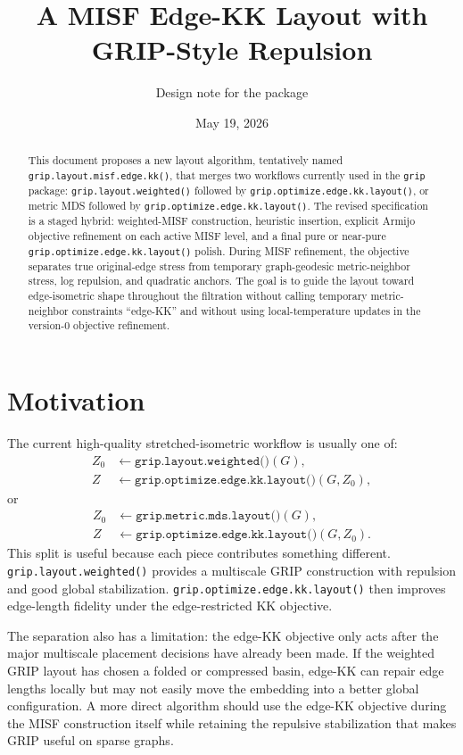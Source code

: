 \documentclass[11pt]{article}
\title{A MISF Edge-KK Layout with GRIP-Style Repulsion}
\author{Design note for the \grip{} package}
\date{May 19, 2026}
\newcommand{\grip}{\texttt{grip}}
\newcommand{\Rfunc}[1]{\texttt{#1}}
\begin{document}
\maketitle

\begin{abstract}
This document proposes a new layout algorithm, tentatively named
\Rfunc{grip.layout.misf.edge.kk()}, that merges two workflows currently used in
the \grip{} package: \Rfunc{grip.layout.weighted()} followed by
\Rfunc{grip.optimize.edge.kk.layout()}, or metric MDS followed by
\Rfunc{grip.optimize.edge.kk.layout()}. The revised specification is a staged
hybrid: weighted-MISF construction, heuristic insertion, explicit Armijo
objective refinement on each active MISF level, and a final pure or near-pure
\Rfunc{grip.optimize.edge.kk.layout()} polish. During MISF refinement, the
objective separates true original-edge stress from temporary graph-geodesic
metric-neighbor stress, log repulsion, and quadratic anchors. The goal is to
guide the layout toward edge-isometric shape throughout the filtration without
calling temporary metric-neighbor constraints ``edge-KK'' and without using
local-temperature updates in the version-0 objective refinement.
\end{abstract}

\tableofcontents

\section{Motivation}

The current high-quality stretched-isometric workflow is usually one of:
\begin{align*}
  Z_0 &\leftarrow \Rfunc{grip.layout.weighted()}(G),\\
  Z   &\leftarrow \Rfunc{grip.optimize.edge.kk.layout()}(G, Z_0),
\end{align*}
or
\begin{align*}
  Z_0 &\leftarrow \Rfunc{grip.metric.mds.layout()}(G),\\
  Z   &\leftarrow \Rfunc{grip.optimize.edge.kk.layout()}(G, Z_0).
\end{align*}
This split is useful because each piece contributes something different.
\Rfunc{grip.layout.weighted()} provides a multiscale GRIP construction with
repulsion and good global stabilization. \Rfunc{grip.optimize.edge.kk.layout()}
then improves edge-length fidelity under the edge-restricted KK objective.

The separation also has a limitation: the edge-KK objective only acts after the
major multiscale placement decisions have already been made. If the weighted
GRIP layout has chosen a folded or compressed basin, edge-KK can repair edge
lengths locally but may not easily move the embedding into a better global
configuration. A more direct algorithm should use the edge-KK objective during
the MISF construction itself while retaining the repulsive stabilization that
makes GRIP useful on sparse graphs.
\end{document}
